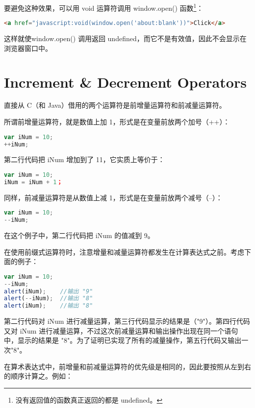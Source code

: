 要避免这种效果，可以用 void 运算符调用 window.open() 函数\footnote{没有返回值的函数真正返回的都是 undefined。}：


\begin{lstlisting}[language=HTML]
<a href="javascript:void(window.open('about:blank'))">Click</a>
\end{lstlisting}

这样就使window.open() 调用返回 undefined，而它不是有效值，因此不会显示在浏览器窗口中。

\section{Increment \& Decrement Operators}

直接从 C（和 Java）借用的两个运算符是前增量运算符和前减量运算符。

所谓前增量运算符，就是数值上加 1，形式是在变量前放两个加号（++）：

\begin{lstlisting}[language=JavaScript]
var iNum = 10;
++iNum;
\end{lstlisting}

第二行代码把 iNum 增加到了 11，它实质上等价于：


\begin{lstlisting}[language=JavaScript]
var iNum = 10;
iNum = iNum + 1；
\end{lstlisting}

同样，前减量运算符是从数值上减 1，形式是在变量前放两个减号（--）：

\begin{lstlisting}[language=JavaScript]
var iNum = 10;
--iNum;
\end{lstlisting}

在这个例子中，第二行代码把 iNum 的值减到 9。

在使用前缀式运算符时，注意增量和减量运算符都发生在计算表达式之前。考虑下面的例子：

\begin{lstlisting}[language=JavaScript]
var iNum = 10;
--iNum;
alert(iNum);	//输出 "9"
alert(--iNum);	//输出 "8"
alert(iNum);	//输出 "8"
\end{lstlisting}

第二行代码对 iNum 进行减量运算，第三行代码显示的结果是（"9"）。第四行代码又对 iNum 进行减量运算，不过这次前减量运算和输出操作出现在同一个语句中，显示的结果是 "8"。为了证明已实现了所有的减量操作，第五行代码又输出一次"8"。

在算术表达式中，前增量和前减量运算符的优先级是相同的，因此要按照从左到右的顺序计算之。例如：

